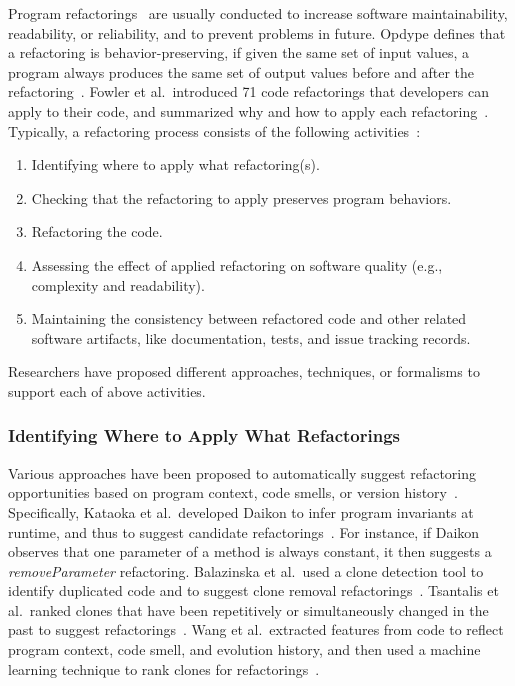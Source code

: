 \documentclass[runningheads,a4paper]{llncs}
\begin{document}
\label{sec:preventive}
Program refactorings~\cite{Fowler1999:refactoring} are usually conducted to increase software maintainability, readability, or reliability, and to prevent problems in future.  Opdype defines that a refactoring is behavior-preserving, if given the same set of input values, a program always produces the same set of output values before and after the refactoring~\cite{Opdyke1992:ROF}. Fowler et al.~introduced 71 code refactorings that developers can apply to their code, and summarized why and how to apply each refactoring~\cite{Fowler1999:refactoring}. Typically, a refactoring process consists of the following activities~\cite{Mens2004:SSR}:
\begin{enumerate}
\item Identifying where to apply what refactoring(s).
\item Checking that the refactoring to apply preserves program behaviors.
\item Refactoring the code.
\item Assessing the effect of applied refactoring on software quality (e.g., complexity and readability). 
\item Maintaining the consistency between refactored code and other related software artifacts, like documentation, tests, and issue tracking records.  
\end{enumerate}

Researchers have proposed different approaches, techniques, or formalisms to support each of above activities.

\subsubsection{Identifying Where to Apply What Refactorings}
Various approaches have been proposed to automatically suggest refactoring opportunities based on program context, code smells, or version history~\cite{Balazinska2000:ACA,Kataoka2001:ASP,Higo2008:metricrefactoring,Tsantalis2011:rankRefactoring,Wang2014:recommendClones,Meng2015:ARO}. Specifically, Kataoka et al.~developed Daikon to infer program invariants at runtime, and thus to suggest candidate refactorings~\cite{Kataoka2001:ASP}. For instance, if Daikon observes that one parameter of a method is always constant, it then suggests a \emph{removeParameter} refactoring. Balazinska et al.~used a clone detection tool to identify duplicated code and to suggest clone removal refactorings~\cite{Balazinska2000:ACA}. Tsantalis et al.~ranked clones that have been repetitively or simultaneously changed in the past to suggest refactorings~\cite{Tsantalis2011:rankRefactoring}. Wang et al.~extracted features from code to reflect program context, code smell, and evolution history, and then used a machine learning technique to rank clones for refactorings~\cite{Wang2014:recommendClones}.
\end{document}
